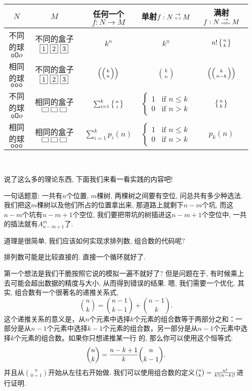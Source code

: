 {\center \begin{tabular}[pos]{|c|c|ccc|}
  \hline
  $N$ & $M$ & 任何一个$f:N\to M$ & 单射$f:N\stackrel{\to}{\text{\tiny 1-1}} M$ & 满射$f:N\stackrel{\to}{\text{\tiny onto}} M$   \\
  \hline
  不同的球$\texttt{oO}o$ & 不同的盒子$\fbox{1}~\fbox{2}~\fbox{3}$ & $k^n$ & $k^{\underline n}$ & $n!\left\{{n \atop k}\right\}$\\
  相同的球$\texttt{ooo}$ & 不同的盒子$\fbox{1}~\fbox{2}~\fbox{3}$ & $\left(\left({k \atop n}\right)\right)$ & ${k\choose n}$ & $\left(\left({k \atop n-k}\right)\right)$\\
  不同的球$\texttt{oO}o$ & 相同的盒子$\fbox{~}~\fbox{~}~\fbox{~}$ & $\sum_{i=1}^k \left\{{n \atop i}\right\}$ & $\begin{cases}1 & \text{if }n\leq k\\ 0& \text{if }n>k\end{cases}$ & $\left\{{n \atop k}\right\}$\\
  相同的球$\texttt{ooo}$ & 相同的盒子$\fbox{~}~\fbox{~}~\fbox{~}$ & $\sum_{i=1}^k p_i(n)$ & $\begin{cases}1 & \text{if }n\leq k\\ 0& \text{if }n>k\end{cases}$ & $p_k(n)$\\
  \hline
\end{tabular}\\}

说了这么多的理论东西, 下面我们来看一看实践的内容吧! 

 一句话题意: 一共有$n$个位置, $m$棵树, 两棵树之间要有空位, 
问总共有多少种选法. 
我们把这$m$棵树以及他们所占的位置拿出来, 那道路上就剩下$n-m$个坑, 
而这$n-m$个坑有$n-m+1$个空位, 
我们要把带坑的树插进这$n-m+1$个空位中, 一共的插法就有$A_{n-m+1}^m$了.

道理是很简单, 我们应该如何实现求排列数, 组合数的代码呢? 

 排列数可能是比较直接的. 直接一个循环就好了. 

 第一个想法是我们干脆按照它说的模拟一遍不就好了? 但是问题在于, 
有时候乘上去可能会超出数据的精度与大小, 从而得到错误的结果. 嗯, 我们需要一个优化. 
其实, 组合数有一个很著名的递推关系式, 
$$\binom{n}{k} = \binom{n-1}{k-1} + \binom{n-1}{k}.$$
这个递推关系的意义是，从$n$个元素中选择$k$个元素的组合数等于两部分之和：一部分是从$n-1$个元素中选择$k-1$个元素的组合数，另一部分是从$n-1$个元素中选择$k$个元素的组合数。如果你只想递推某一行
的, 那么你可以使用这个恒等式: $${n\choose k}={n-k+1\over k}{n\choose k-1}.$$
并且从$n\choose 0=1$开始从左往右开始做. 我们可以使用组合数的定义${n\choose k}={n!\over 
k!(n-k)!}$进行证明. 

